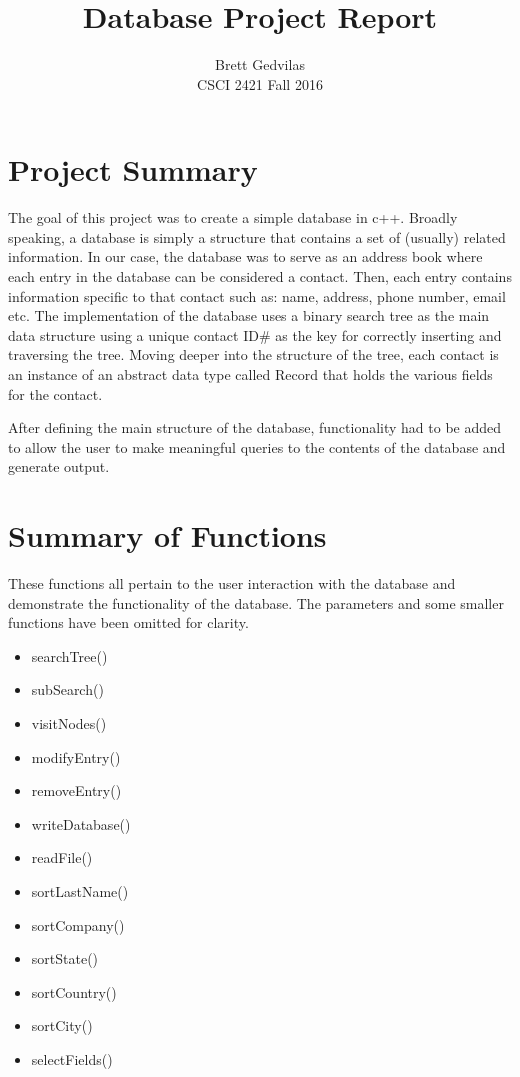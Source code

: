 \documentclass[11pt]{article}
\begin{document}
\title{Database Project Report}
\author{Brett Gedvilas\\CSCI 2421 Fall 2016}
\maketitle

\section*{Project Summary}

The goal of this project was to create a simple database in c++. Broadly speaking, a database is simply a structure that 
contains a set of (usually) related information. In our case, the database was to serve as an address book where each entry 
in the database can be considered a contact. Then, each entry contains information specific to that contact such as: name, 
address, phone number, email etc. The implementation of the database uses a binary search tree as the main data structure 
using a unique contact ID\# as the key for correctly inserting and traversing the tree. Moving deeper into the structure 
of the tree, each contact is an instance of an abstract data type called Record that holds the various fields for the 
contact.

After defining the main structure of the database, functionality had to be added to allow the user to make meaningful 
queries to the contents of the database and generate output.

\newpage



\section*{Summary of Functions}

These functions all pertain to the user interaction with the database and demonstrate the functionality of the database. 
The parameters and some smaller functions have been omitted for clarity.

\begin{itemize}

\item searchTree()
\item subSearch() 
\item visitNodes()
\item modifyEntry()
\item removeEntry()
\item writeDatabase()
\item readFile()
\item sortLastName()
\item sortCompany()
\item sortState()
\item sortCountry()
\item sortCity()
\item selectFields()



\end{itemize}
\end{document}
